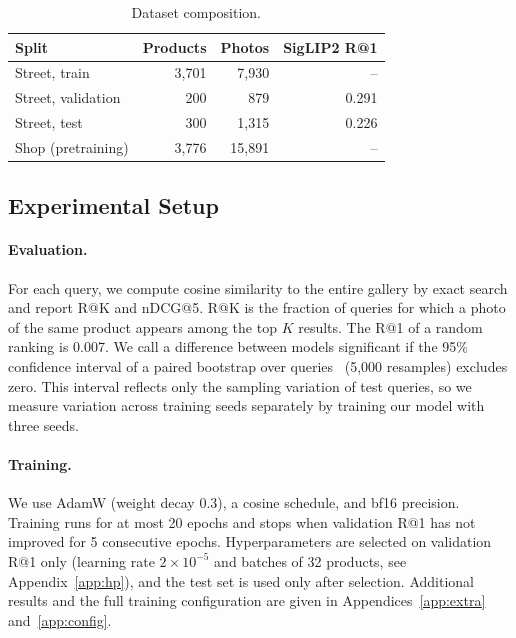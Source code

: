 \documentclass[sigconf,nonacm]{acmart}
\begin{document}
\begin{table}[t]
  \caption{Dataset composition.}
  \label{tab:data}
  \small
  \begin{tabular}{lrrr}
    \toprule
    Split & Products & Photos & SigLIP2 R@1 \\
    \midrule
    Street, train & 3,701 & 7,930 & -- \\
    Street, validation & 200 & 879 & 0.291 \\
    Street, test & 300 & 1,315 & 0.226 \\
    Shop (pretraining) & 3,776 & 15,891 & -- \\
    \bottomrule
  \end{tabular}
  \par\smallskip
\end{table}

\subsection{Experimental Setup}

\paragraph{Evaluation.} For each query, we compute cosine similarity to the entire gallery by exact search and report R@K and nDCG@5. R@K is the fraction of queries for which a photo of the same product appears among the top $K$ results. The R@1 of a random ranking is 0.007. We call a difference between models significant if the 95\% confidence interval of a paired bootstrap over queries~\cite{efron1993bootstrap} (5,000 resamples) excludes zero. This interval reflects only the sampling variation of test queries, so we measure variation across training seeds separately by training our model with three seeds.

\paragraph{Training.} We use AdamW (weight decay 0.3), a cosine schedule, and bf16 precision. Training runs for at most 20 epochs and stops when validation R@1 has not improved for 5 consecutive epochs. Hyperparameters are selected on validation R@1 only (learning rate $2\times10^{-5}$ and batches of 32 products, see Appendix~\ref{app:hp}), and the test set is used only after selection. Additional results and the full training configuration are given in Appendices~\ref{app:extra} and~\ref{app:config}.
\end{document}
